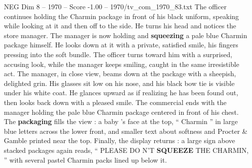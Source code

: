 \begin{textsample}{NEG Dim 8 – 1970 – Score -1.00 – 1970/tv\_com\_1970\_83.txt}
The officer continues holding the Charmin package in front of his black uniform, speaking while looking at it and then off to the side.
He turns his head and notices the store manager.
The manager is now holding and \textbf{squeezing} a pale blue Charmin package himself.
He looks down at it with a private, satisfied smile, his fingers pressing into the soft bundle.
The officer turns toward him with a surprised, accusing look, while the manager keeps smiling, caught in the same irresistible act.
The manager, in close view, beams down at the package with a sheepish, delighted grin.
His glasses sit low on his nose, and his black bow tie is visible under his white coat.
He glances upward as if realizing he has been found out, then looks back down with a pleased smile.
The commercial ends with the manager holding the pale blue Charmin package centered in front of his chest.
The \textbf{packaging} fills the view : a baby ’s face at the top, “ Charmin ” in large blue letters across the lower front, and smaller text about softness and Procter \& Gamble printed near the top.
Finally, the display returns : a large sign above stacked packages again reads, “ PLEASE DO N’T \textbf{SQUEEZE} THE CHARMIN, ” with several pastel Charmin packs lined up below it.

\end{textsample}
